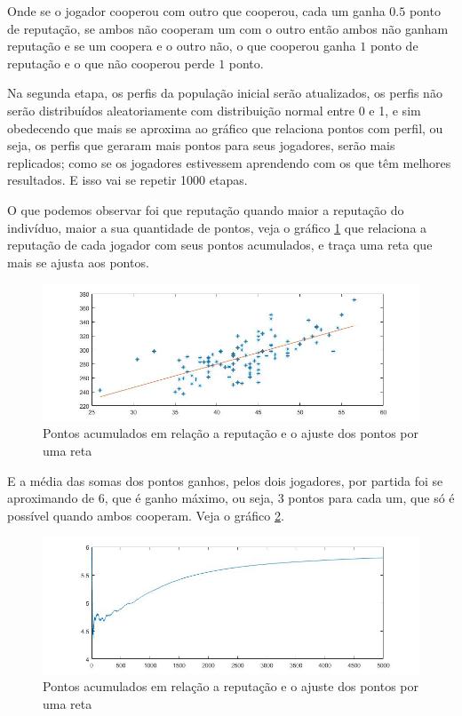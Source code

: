 Onde se o jogador cooperou com outro que cooperou, cada um ganha $0.5$ ponto de reputação, se ambos não cooperam um com o outro então ambos não ganham reputação e se um coopera e o outro não, o que cooperou ganha $1$ ponto de reputação e o que não cooperou perde $1$ ponto.

Na segunda etapa, os perfis da população inicial serão atualizados, os perfis não serão distribuídos aleatoriamente com distribuição normal entre 0 e 1, e sim obedecendo que mais se aproxima ao gráfico que relaciona pontos com perfil, ou seja, os perfis que geraram mais pontos para seus jogadores, serão mais replicados; como se os jogadores estivessem aprendendo com os que têm melhores resultados. E isso vai se repetir 1000 etapas.

O que podemos observar foi que reputação quando maior a reputação do indivíduo, maior a sua quantidade de pontos, veja o gráfico \ref{fig14} que relaciona a reputação de cada jogador com seus pontos acumulados, e traça uma reta que mais se ajusta aos pontos.

\begin{figure}[H]
\centering
\includegraphics[width=14cm]{graf14.jpg}
\caption{Pontos acumulados em relação a reputação e o ajuste dos pontos por uma reta}
\label{fig14}
\end{figure}

E a média das somas dos pontos ganhos, pelos dois jogadores, por partida foi se aproximando de $6$, que é ganho máximo, ou seja, $3$ pontos para cada um, que só é possível quando ambos cooperam. Veja o gráfico \ref{fig15}.

\begin{figure}[H]
\centering
\includegraphics[width=14cm]{graf15.jpg}
\caption{Pontos acumulados em relação a reputação e o ajuste dos pontos por uma reta}
\label{fig15}
\end{figure}

